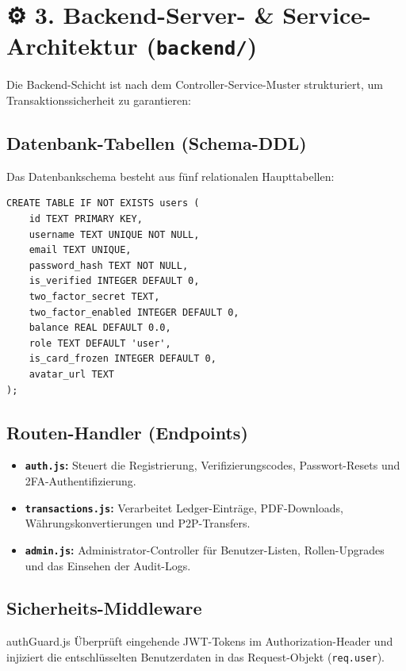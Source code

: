 \documentclass[11pt,a4paper]{article}
\begin{document}
\section{⚙️ 3. Backend-Server- \& Service-Architektur (\texttt{backend/})}
Die Backend-Schicht ist nach dem Controller-Service-Muster strukturiert, um Transaktionssicherheit zu garantieren:

\subsection{Datenbank-Tabellen (Schema-DDL)}
Das Datenbankschema besteht aus fünf relationalen Haupttabellen:
\begin{lstlisting}[caption={Datenbank-Tabellendefinition}]
CREATE TABLE IF NOT EXISTS users (
    id TEXT PRIMARY KEY,
    username TEXT UNIQUE NOT NULL,
    email TEXT UNIQUE,
    password_hash TEXT NOT NULL,
    is_verified INTEGER DEFAULT 0,
    two_factor_secret TEXT,
    two_factor_enabled INTEGER DEFAULT 0,
    balance REAL DEFAULT 0.0,
    role TEXT DEFAULT 'user',
    is_card_frozen INTEGER DEFAULT 0,
    avatar_url TEXT
);
\end{lstlisting}

\subsection{Routen-Handler (Endpoints)}
\begin{itemize}
    \item \textbf{\texttt{auth.js}:} Steuert die Registrierung, Verifizierungscodes, Passwort-Resets und 2FA-Authentifizierung.
    \item \textbf{\texttt{transactions.js}:} Verarbeitet Ledger-Einträge, PDF-Downloads, Währungskonvertierungen und P2P-Transfers.
    \item \textbf{\texttt{admin.js}:} Administrator-Controller für Benutzer-Listen, Rollen-Upgrades und das Einsehen der Audit-Logs.
\end{itemize}

\subsection{Sicherheits-Middleware}
\begin{ImportanceBox}{authGuard.js}
Überprüft eingehende JWT-Tokens im Authorization-Header und injiziert die entschlüsselten Benutzerdaten in das Request-Objekt (\texttt{req.user}).
\end{ImportanceBox}
\end{document}
